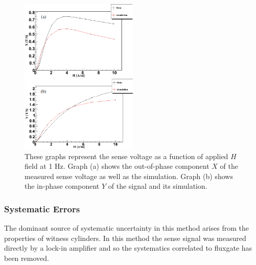 \begin{figure}[h!]
\begin{center}
   \includegraphics[width=0.5\textwidth]{data_and_simulation3.PNG}
    \caption{These graphs represent the sense voltage as a function of applied $H$ field at 1 Hz. Graph (a) shows the out-of-phase component $X$ of the measured sense voltage as well as the simulation. Graph (b) shows the in-phase component $Y$ of the signal and its simulation.}
    \label{fig:data_and_simulation}
    \end{center}
\end{figure} 

\subsubsection{Systematic Errors}

%




The dominant source of systematic uncertainty in this method arises
from the properties of witness cylinders. 
In this method the sense signal was measured directly by a lock-in amplifier and so the systematics correlated to fluxgate has been removed.


